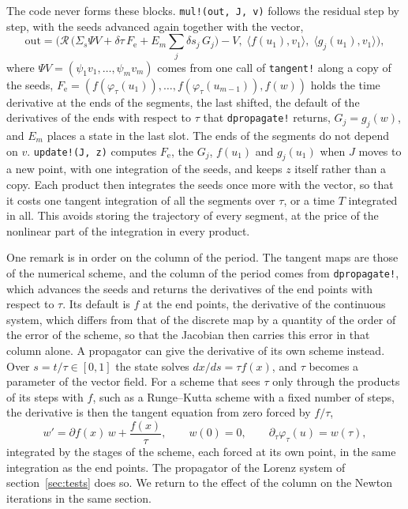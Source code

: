 \documentclass[11pt,a4paper]{article}
\newcommand{\ip}[2]{\langle #1, #2\rangle}
\newcommand{\roll}{\mathcal{R}}
\newcommand{\code}[1]{\texttt{#1}}
\begin{document}
The code never forms these blocks. \code{mul!(out, J, v)} follows the residual step by step, with
the seeds advanced again together with the vector,
\begin{equation}
  \text{out} = \Big(\roll\,\big(\Sigma_s \Psi V + \delta\tau\, F_{\mathrm{e}} + E_m \textstyle\sum_j \delta s_j\, G_j\big) - V,\;
    \ip{f(u_1)}{v_1},\; \ip{g_j(u_1)}{v_1}\Big),
\end{equation}
where $\Psi V = (\psi_1 v_1, \dots, \psi_m v_m)$ comes from one call of \code{tangent!} along a copy
of the seeds, $F_{\mathrm{e}} = (f(\varphi_\tau(u_1)), \dots, f(\varphi_\tau(u_{m-1})), f(w))$
holds the time derivative at the ends of the segments, the last shifted, the default of the
derivatives of the ends with respect to $\tau$ that \code{dpropagate!} returns, $G_j = g_j(w)$, and $E_m$
places a state in the last slot. The ends of the segments do not depend on $v$. \code{update!(J,
z)} computes $F_{\mathrm{e}}$, the $G_j$, $f(u_1)$ and $g_j(u_1)$ when $J$ moves to a new point,
with one integration of the seeds, and keeps $z$ itself rather than a copy. Each product then
integrates the seeds once more with the vector, so that it costs one tangent integration of all
the segments over $\tau$, or a time $T$ integrated in all. This avoids storing the trajectory of
every segment, at the price of the nonlinear part of the integration in every product.

One remark is in order on the column of the period. The tangent maps are those of the numerical
scheme, and the column of the period comes from \code{dpropagate!}, which advances the seeds and
returns the derivatives of the end points with respect to $\tau$. Its default is $f$ at the end
points, the derivative of the continuous system, which differs from that of the discrete map by a
quantity of the order of the error of the scheme, so that the Jacobian then carries this error in
that column alone. A propagator can give the derivative of its own scheme instead. Over
$s = t/\tau \in [0, 1]$ the state solves $dx/ds = \tau f(x)$, and $\tau$ becomes a parameter of the
vector field. For a scheme that sees $\tau$ only through the products of its steps with $f$, such
as a Runge--Kutta scheme with a fixed number of steps, the derivative is then the tangent equation
from zero forced by $f/\tau$,
\begin{equation}
  w' = \partial f(x)\, w + \frac{f(x)}{\tau}, \qquad w(0) = 0, \qquad
  \partial_\tau \varphi_\tau(u) = w(\tau),
  \label{eq:dpropagate}
\end{equation}
integrated by the stages of the scheme, each forced at its own point, in the same integration as
the end points. The propagator of the Lorenz system of section~\ref{sec:tests} does so. We return
to the effect of the column on the Newton iterations in the same section.
\end{document}
